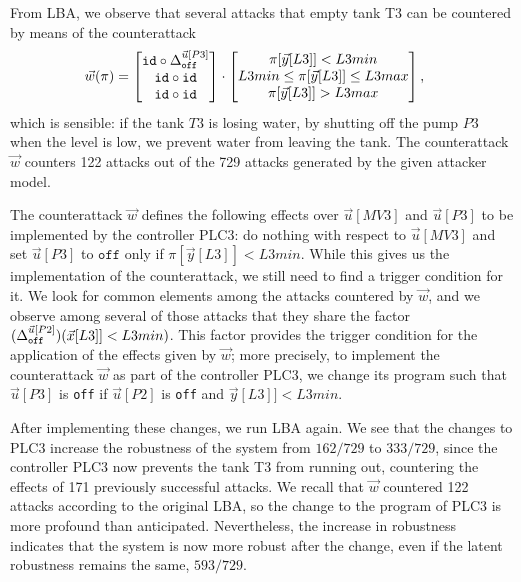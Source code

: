 {{From LBA, we observe that several attacks that empty tank T3 can be countered by means of the counterattack 
\begin{align*}
    \vec{w}(\pi)&=
    \begin{bmatrix}
    {\texttt{id}}\circ {\Delta}^{\vec{u}[P3]}_{\texttt{off}} \\
     {\texttt{id}}\circ {\texttt{id}} \\
     {\texttt{id}}\circ {\texttt{id}} \\
    \end{bmatrix}
    \cdot
    \begin{bmatrix}
      \pi[\vec{y}[L3]]<L3min \\
      L3min \leq \pi[\vec{y}[L3]]\leq L3max \\
      \pi[\vec{y}[L3]]>L3max
    \end{bmatrix},
  \end{align*} 
which is sensible: if the tank $T3$ is losing water, by shutting off the pump $P3$ when the level is low, we prevent water from leaving the tank. The counterattack $\vec{w}$ counters 122 attacks out of the 729 attacks generated by the given attacker model.

The counterattack $\vec{w}$ defines the following effects over $\vec{u}[MV3]$ and $\vec{u}[P3]$ to be implemented by the controller PLC3: do nothing with respect to $\vec{u}[MV3]$ and set $\vec{u}[P3]$ to $\texttt{off}$ only if $\pi[\vec{y}[L3]]<L3min$. While this gives us the implementation of the counterattack, we still need to find a trigger condition for it. We look for common elements among the attacks countered by $\vec{w}$, and we observe among several of those attacks that they share the factor $({\Delta}^{\vec{u}[P2]}_{\texttt{off}})(\vec{x}[L3]]<L3min)$. This factor provides the trigger condition for the application of the effects given by $\vec{w}$; more precisely, to implement the counterattack $\vec{w}$ as part of the controller PLC3, we change its program such that $\vec{u}[P3]$ is \texttt{off} if $\vec{u}[P2]$ is \texttt{off} and $\vec{y}[L3]]<L3min$. 

After implementing these changes, we run LBA again. We see that the changes to PLC3 increase the robustness of the system from $162/729$ to $333/729$, since the controller PLC3 now prevents the tank T3 from running out, countering the effects of 171 previously successful attacks. We recall that $\vec{w}$ countered 122 attacks according to the original LBA, so the change to the program of PLC3 is more profound than anticipated. Nevertheless, the increase in robustness indicates that the system is now more robust after the change, even if the latent robustness remains the same, $593/729$. 

}}
